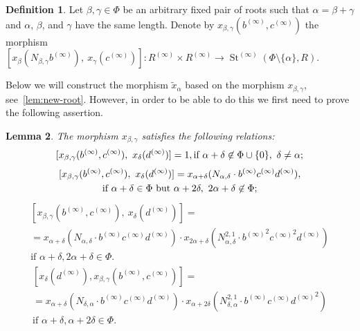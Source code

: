 \documentclass[oneside, 11pt]{amsart}
\numberwithin{equation}{section}
\newtheorem{lemma}{Lemma} \numberwithin{lemma}{section}
\theoremstyle{definition}
\newtheorem{df}[lemma]{Definition} \Crefname{df}{Definition}{Definitions}
\theoremstyle{remark}
\DeclareMathOperator\St{St}
\begin{document}
\begin{df} \label{def:xbg}
Let $\beta, \gamma \in \Phi$ be an arbitrary fixed pair of roots such that $\alpha = \beta+\gamma$ and $\alpha$, $\beta$, and $\gamma$ have the same length. 
Denote by $x_{\beta,\gamma}(b^{(\infty)}, c^{(\infty)})$ the morphism
 $[x_\beta(N_{\beta,\gamma}b^{(\infty)}),\ x_\gamma(c^{(\infty)})]\colon R^{(\infty)} \times R^{(\infty)} \to \St^{(\infty)}(\Phi \setminus\{\alpha\}, R).$
\end{df}
Below we will construct the morphism $\widetilde x_\alpha$ based on the morphism $x_{\beta,\gamma}$, see~\cref{lem:new-root}. However, in order to be able to do this we first need to prove the following assertion.

\begin{lemma} \label{lem:elim-lhs}
 The morphism $x_{\beta, \gamma}$ satisfies the following relations:
 \begin{multline} \label{R2-bg}
  [x_{\beta, \gamma}(b^{(\infty)}, c^{(\infty)}),\ x_\delta(d^{(\infty)})] = 1, \hfill \text{if $\alpha + \delta \not\in\Phi \cup \{0\},\ \delta\neq\alpha;$}
 \end{multline}
 \begin{multline} \label{R3-bg}
   [x_{\beta, \gamma}(b^{(\infty)}, c^{(\infty)}),\ x_\delta(d^{(\infty)})] = x_{\alpha + \delta}(N_{\alpha,\delta} \cdot b^{(\infty)}c^{(\infty)}d^{(\infty)}), \hfill \\ \text{if $\alpha+\delta\in\Phi$ but $\alpha+2\delta,\ 2\alpha+\delta\not\in\Phi;$}
 \end{multline}
 {\setlength{\abovedisplayskip}{0pt} \setlength{\belowdisplayskip}{0pt}
 \begin{multline} \label{R4-bg1}
  [x_{\beta, \gamma}(b^{(\infty)}, c^{(\infty)}),\ x_\delta(d^{(\infty)})] = \\ = x_{\alpha + \delta}(N_{\alpha,\delta} \cdot b^{(\infty)}c^{(\infty)}d^{(\infty)}) \cdot  x_{2\alpha+\delta}(N_{\alpha,\delta}^{2,1} \cdot {b^{(\infty)}}^2{c^{(\infty)}}^2d^{(\infty)}) \\
  \text{if $\alpha+\delta,2\alpha+\delta\in\Phi.$}
 \end{multline} 
 \begin{multline} \label{R4-bg2}
  [x_\delta(d^{(\infty)}), x_{\beta, \gamma}(b^{(\infty)}, c^{(\infty)})] = \\ = x_{\alpha + \delta}(N_{\delta, \alpha} \cdot b^{(\infty)}c^{(\infty)}d^{(\infty)}) \cdot x_{\alpha+2\delta}(N_{\delta, \alpha}^{2,1} \cdot {b^{(\infty)}}{c^{(\infty)}}{d^{(\infty)}}^2) \\
  \text{if $\alpha+\delta,\alpha+2\delta\in\Phi.$}
 \end{multline}}
\end{lemma}
\end{document}
